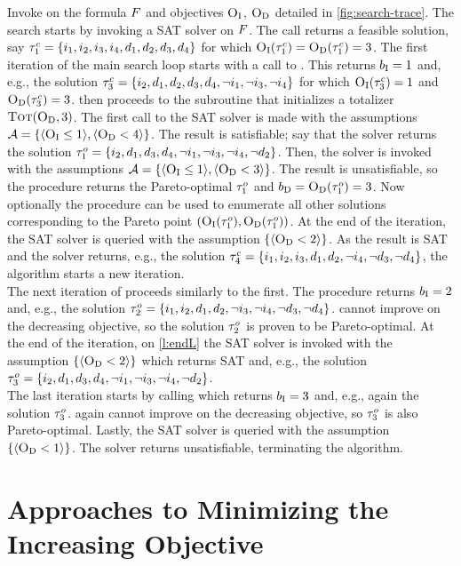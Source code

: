 \begin{example}\label{ex:main-iteration}
  Invoke \algname{} on the formula $F$ and objectives $\textsc{O}_{\text{I}}$, $\textsc{O}_{\text{D}}$ detailed in \cref{fig:search-trace}. 
  The search starts by invoking a SAT solver on $F$.
  The call returns a feasible solution, say $\tau^c_1 = \{i_1,\allowbreak i_2,\allowbreak i_3,\allowbreak i_4,\allowbreak d_1,\allowbreak d_2,\allowbreak d_3,\allowbreak d_4\}$ for which $\textsc{O}_{\text{I}}(\tau^c_1) = \textsc{O}_{\text{D}}(\tau^c_1) = 3$. 
  The first iteration of the main search loop starts with a call to \Min{}.
  This returns $b_{\text{I}} = 1$ and, e.g., the solution $\tau^c_3 = \{i_2,\allowbreak d_1,\allowbreak d_2,\allowbreak d_3,\allowbreak d_4,\allowbreak \lnot i_1,\allowbreak \lnot i_3,\allowbreak \lnot i_4\}$ for which $\textsc{O}_{\text{I}}(\tau^c_3) = 1$ and $\textsc{O}_{\text{D}}(\tau^c_3) = 3$.
  \algname{} then proceeds to the \Simpr{} subroutine that initializes a totalizer $\textsc{Tot}(\textsc{O}_{\text{D}}, 3)$.
  The first call to the SAT solver is made with the assumptions $\mathcal{A} = \{ \langle \textsc{O}_{\text{I}} \leq 1 \rangle, \langle \textsc{O}_{\text{D}} < 4 \rangle \}$.
  The result is satisfiable;
  say that the solver returns the solution $\tau^o_1 = \{i_2,\allowbreak d_1,\allowbreak d_3,\allowbreak d_4,\allowbreak \lnot i_1,\allowbreak \lnot i_3,\allowbreak \lnot i_4,\allowbreak \lnot d_2\}$.
  Then, the solver is invoked with the assumptions $\mathcal{A} =  \{ \langle \textsc{O}_{\text{I}} \leq 1 \rangle, \langle \textsc{O}_{\text{D}} < 3 \rangle \}$.
  The result is unsatisfiable, so the procedure returns the Pareto-optimal $\tau^o_1$ and $b_{\text{D}} = \textsc{O}_{\text{D}}(\tau^o_1) = 3$.
  Now optionally the procedure \E can be used to enumerate all other solutions corresponding to the Pareto point $(\textsc{O}_{\text{I}}(\tau^o_1),\textsc{O}_{\text{D}}(\tau^o_1))$.
  At the end of the iteration, the SAT solver is queried with the assumption $\{ \langle \textsc{O}_{\text{D}} < 2 \rangle \}$.
  As the result is SAT and the solver returns, e.g., the solution $\tau^c_4 = \{i_1,\allowbreak i_2,\allowbreak i_3,\allowbreak d_1,\allowbreak d_2,\allowbreak \lnot i_4,\allowbreak \lnot d_3,\allowbreak \lnot d_4\}$,
  the algorithm starts a new iteration. \\
  The next iteration of \algname{} proceeds similarly to the first.
  The procedure \Min{} returns $b_{\text{I}} = 2$ and, e.g., the solution $\tau^o_2 = \{i_1,\allowbreak i_2,\allowbreak d_1,\allowbreak d_2,\allowbreak \lnot i_3,\allowbreak \lnot i_4,\allowbreak \lnot d_3,\allowbreak \lnot d_4\}$.
  \Simpr{} cannot improve on the decreasing objective, so the solution $\tau^o_2$ is proven to be Pareto-optimal.
  At the end of the iteration, on \cref{l:endL} the SAT solver is invoked with the assumption $\{\langle \textsc{O}_{\text{D}} < 2 \rangle\}$ which returns SAT and, e.g., the solution $\tau^o_3 = \{i_2,\allowbreak d_1,\allowbreak d_3,\allowbreak d_4,\allowbreak \lnot i_1,\allowbreak \lnot i_3,\allowbreak \lnot i_4,\allowbreak \lnot d_2\}$. \\
  The last iteration starts by calling \Min{} which returns $b_{\text{I}} = 3$ and, e.g., again the solution $\tau^o_3$.
  \Simpr{} again cannot improve on the decreasing objective, so $\tau^o_3$ is also Pareto-optimal.
  Lastly, the SAT solver is queried with the assumption $\{\langle \textsc{O}_{\text{D}} < 1 \rangle\}$.
  The solver returns unsatisfiable, terminating the algorithm. 
\end{example}

\section{Approaches to Minimizing the Increasing Objective\label{sec:variants}}

